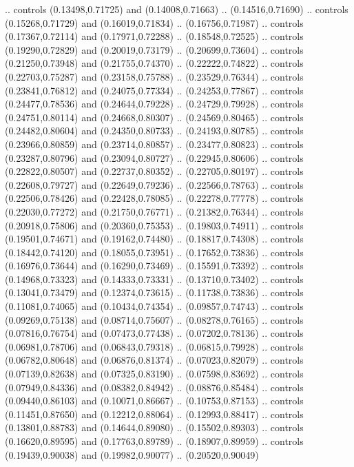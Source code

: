     .. controls (0.13498,0.71725) and (0.14008,0.71663) .. (0.14516,0.71690)
    .. controls (0.15268,0.71729) and (0.16019,0.71834) .. (0.16756,0.71987)
    .. controls (0.17367,0.72114) and (0.17971,0.72288) .. (0.18548,0.72525)
    .. controls (0.19290,0.72829) and (0.20019,0.73179) .. (0.20699,0.73604)
    .. controls (0.21250,0.73948) and (0.21755,0.74370) .. (0.22222,0.74822)
    .. controls (0.22703,0.75287) and (0.23158,0.75788) .. (0.23529,0.76344)
    .. controls (0.23841,0.76812) and (0.24075,0.77334) .. (0.24253,0.77867)
    .. controls (0.24477,0.78536) and (0.24644,0.79228) .. (0.24729,0.79928)
    .. controls (0.24751,0.80114) and (0.24668,0.80307) .. (0.24569,0.80465)
    .. controls (0.24482,0.80604) and (0.24350,0.80733) .. (0.24193,0.80785)
    .. controls (0.23966,0.80859) and (0.23714,0.80857) .. (0.23477,0.80823)
    .. controls (0.23287,0.80796) and (0.23094,0.80727) .. (0.22945,0.80606)
    .. controls (0.22822,0.80507) and (0.22737,0.80352) .. (0.22705,0.80197)
    .. controls (0.22608,0.79727) and (0.22649,0.79236) .. (0.22566,0.78763)
    .. controls (0.22506,0.78426) and (0.22428,0.78085) .. (0.22278,0.77778)
    .. controls (0.22030,0.77272) and (0.21750,0.76771) .. (0.21382,0.76344)
    .. controls (0.20918,0.75806) and (0.20360,0.75353) .. (0.19803,0.74911)
    .. controls (0.19501,0.74671) and (0.19162,0.74480) .. (0.18817,0.74308)
    .. controls (0.18442,0.74120) and (0.18055,0.73951) .. (0.17652,0.73836)
    .. controls (0.16976,0.73644) and (0.16290,0.73469) .. (0.15591,0.73392)
    .. controls (0.14968,0.73323) and (0.14333,0.73331) .. (0.13710,0.73402)
    .. controls (0.13041,0.73479) and (0.12374,0.73615) .. (0.11738,0.73836)
    .. controls (0.11081,0.74065) and (0.10434,0.74354) .. (0.09857,0.74743)
    .. controls (0.09269,0.75138) and (0.08714,0.75607) .. (0.08278,0.76165)
    .. controls (0.07816,0.76754) and (0.07473,0.77438) .. (0.07202,0.78136)
    .. controls (0.06981,0.78706) and (0.06843,0.79318) .. (0.06815,0.79928)
    .. controls (0.06782,0.80648) and (0.06876,0.81374) .. (0.07023,0.82079)
    .. controls (0.07139,0.82638) and (0.07325,0.83190) .. (0.07598,0.83692)
    .. controls (0.07949,0.84336) and (0.08382,0.84942) .. (0.08876,0.85484)
    .. controls (0.09440,0.86103) and (0.10071,0.86667) .. (0.10753,0.87153)
    .. controls (0.11451,0.87650) and (0.12212,0.88064) .. (0.12993,0.88417)
    .. controls (0.13801,0.88783) and (0.14644,0.89080) .. (0.15502,0.89303)
    .. controls (0.16620,0.89595) and (0.17763,0.89789) .. (0.18907,0.89959)
    .. controls (0.19439,0.90038) and (0.19982,0.90077) .. (0.20520,0.90049)
